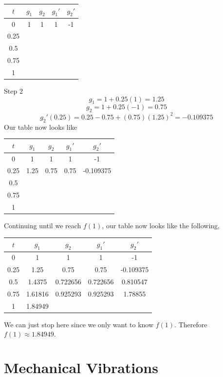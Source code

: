 \documentclass[10pt,reqno]{book}
\theoremstyle{definition}
\begin{document}
	\begin{center}
		\begin{tabular}{|c|c|c|c|c|} \hline
			$ t $ & $ g_1 $ & $ g_2 $ & $ g_1' $ & $ g_2' $ \\ \hline
			0 & 1 & 1 & 1 & -1 \\ \hline
			0.25 & & & & \\ \hline
			0.5 & & & & \\ \hline 
			0.75 & & & & \\ \hline 
			1 & & & & \\ \hline
		\end{tabular}
	\end{center}
	Step 2
	\[ g_1 = 1 + 0.25(1) = 1.25 \]
	\[ g_2 = 1 + 0.25(-1) = 0.75 \]
	\[ g_2'(0.25) = 0.25 - 0.75 + (0.75)(1.25)^2 = -0.109375 \]
	Our table now looks like
	\begin{center}
		\begin{tabular}{|c|c|c|c|c|} \hline
			$ t $ & $ g_1 $ & $ g_2 $ & $ g_1' $ & $ g_2' $ \\ \hline
			0 & 1 & 1 & 1 & -1 \\ \hline
			0.25 & 1.25 & 0.75 & 0.75 &-0.109375 \\ \hline
			0.5 & & & & \\ \hline 
			0.75 & & & & \\ \hline 
			1 & & & & \\ \hline
		\end{tabular}
	\end{center}
	Continuing until we reach $ f(1) $, our table now looks like the following,
	\begin{center}
		\begin{tabular}{|c|c|c|c|c|} \hline
			$ t $ & $ g_1 $ & $ g_2 $ & $ g_1' $ & $ g_2' $ \\ \hline
			0 & 1 & 1 & 1 & -1 \\ \hline
			0.25 & 1.25 & 0.75 & 0.75 &-0.109375 \\ \hline
			0.5 & 1.4375 & 0.722656 & 0.722656 & 0.810547 \\ \hline 
			0.75 & 1.61816 & 0.925293 & 0.925293 & 1.78855 \\ \hline 
			1 & 1.84949 & & & \\ \hline
		\end{tabular}
	\end{center}
	We can just stop here since we only want to know $ f(1) $. Therefore $ f(1) \approx 1.84949 $.
	
	

	\section{Mechanical Vibrations}
\end{document}
